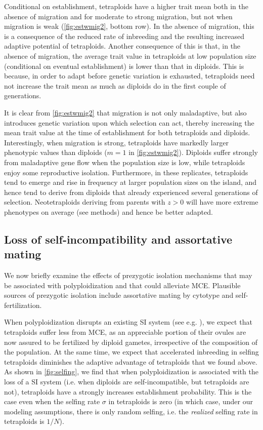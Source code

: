 \documentclass[12pt,a4paper]{article}
\begin{document}
Conditional on establishment, tetraploids have a higher trait mean both in the
absence of migration and for moderate to strong migration, but not when
migration is weak (\cref{fig:estwmig2}, bottom row).
In the absence of migration, this is a consequence of the reduced rate of
inbreeding and the resulting increased adaptive potential of tetraploids.
Another consequence of this is that, in the absence of migration, the average
trait value in tetraploids at low population size (conditional on eventual
establishment) is lower than that in diploids.
This is because, in order to adapt before genetic variation is exhausted,
tetraploids need not increase the trait mean as much as diploids do in the
first couple of generations.

It is clear from \cref{fig:estwmig2} that migration is not only maladaptive,
but also introduces genetic variation upon which selection can act, thereby
increasing the mean trait value at the time of establishment for both
tetraploids and diploids.
Interestingly, when migration is strong, tetraploids have markedly larger
phenotypic values than diploids ($m=1$ in \cref{fig:estwmig2}).
Diploids suffer strongly from maladaptive gene flow when the population size is
low, while tetraploids enjoy some reproductive isolation.
Furthermore, in these replicates, tetraploids tend to emerge and rise in
frequency at larger population sizes on the island, and hence tend to derive
from diploids that already experienced several generations of selection.
Neotetraploids deriving from parents with $z>0$ will have more extreme
phenotypes on average (see methods) and hence be better adapted.


\subsection*{Loss of self-incompatibility and assortative mating}

We now briefly examine the effects of prezygotic isolation mechanisms that may
be associated with polyploidization and that could alleviate MCE.
Plausible sources of prezygotic isolation include assortative mating by
cytotype and self-fertilization.

When polyploidization disrupts an existing SI system (see e.g.
\cite{robertson2011comparative,zenil2019,novikova2023}), we expect
that tetraploids suffer less from MCE, as an appreciable portion of their
ovules are now assured to be fertilized by diploid gametes, irrespective of the
composition of the population.
At the same time, we expect that accelerated inbreeding in selfing tetraploids
diminishes the adaptive advantage of tetraploids that we found above.
As shown in \cref{fig:selfing}, we find that when polyploidization is
associated with the loss of a SI system (i.e. when diploids are
self-incompatible, but tetraploids are not), tetraploids have a strongly
increases establishment probability.
This is the case even when the selfing rate $\sigma$ in tetraploids is zero (in
which case, under our modeling assumptions, there is only random selfing, i.e.
the \textit{realized} selfing rate in tetraploids is $1/N$).
\end{document}
